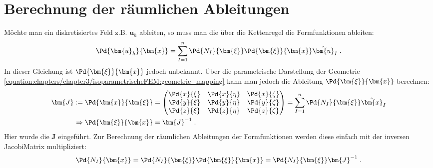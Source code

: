 \documentclass[letterpaper,10pt,german]{jupyterBook}
\begin{document}
\section{Berechnung der räumlichen Ableitungen}
\label{\detokenize{chapters/chapter3/isoparametrischeFEM:berechnung-der-raumlichen-ableitungen}}
\sphinxAtStartPar
Möchte man ein diskretisiertes Feld z.B. \(\bm{u}_h\) ableiten, so muss man die über die Kettenregel die Formfunktionen ableiten:
\begin{equation}\label{equation:chapters/chapter3/isoparametrischeFEM:ableitungFormfunktion}
\begin{split}\begin{align}
\Pd{\bm{u}_h}{\bm{x}} = \sum_{I=1}^{n} \Pd{N_I}{\bm{\xi}} \Pd{\bm{\xi}}{\bm{x}}  \hat{\bm{u}}_I \;.
\end{align}\end{split}
\end{equation}
\sphinxAtStartPar
In dieser Gleichung ist \(\Pd{\bm{\xi}}{\bm{x}}\) jedoch unbekannt. Über die parametrische Darstellung der Geometrie \eqref{equation:chapters/chapter3/isoparametrischeFEM:geometric_mapping} kann man jedoch die Ableitung \(\Pd{\bm{\xi}}{\bm{x}}\) berechnen:
\begin{equation}\label{equation:chapters/chapter3/isoparametrischeFEM:ableitungFormfunktion_02}
\begin{split}\begin{align}
\bm{J} := \Pd{\bm{x}}{\bm{\xi}} & = \begin{pmatrix}
\Pd{x}{\xi} & \Pd{x}{\eta} & \Pd{x}{\zeta} \\
\Pd{y}{\xi} & \Pd{y}{\eta} & \Pd{y}{\zeta} \\
\Pd{z}{\xi} & \Pd{z}{\eta} & \Pd{z}{\zeta} 
\end{pmatrix}
=  \sum_{I=1}^{n} \Pd{N_I}{\bm{\xi}} \hat{\bm{x}}_I \\
\Rightarrow \Pd{\bm{\xi}}{\bm{x}} & = \bm{J}^{-1} \; .
\end{align}\end{split}
\end{equation}
\sphinxAtStartPar
Hier wurde die  \(\bm{J}\) eingeführt. Zur Berechnung der räumlichen Ableitungen der Formfunktionen werden diese einfach mit der inversen Jacobi\sphinxhyphen{}Matrix multipliziert:
\begin{equation}\label{equation:chapters/chapter3/isoparametrischeFEM:ableitungFormfunktion_03}
\begin{split}\Pd{N_I}{\bm{x}} = \Pd{N_I}{\bm{\xi}} \Pd{\bm{\xi}}{\bm{x}} = \Pd{N_I}{\bm{\xi}} \bm{J}^{-1} \; .\end{split}
\end{equation}
\end{document}
